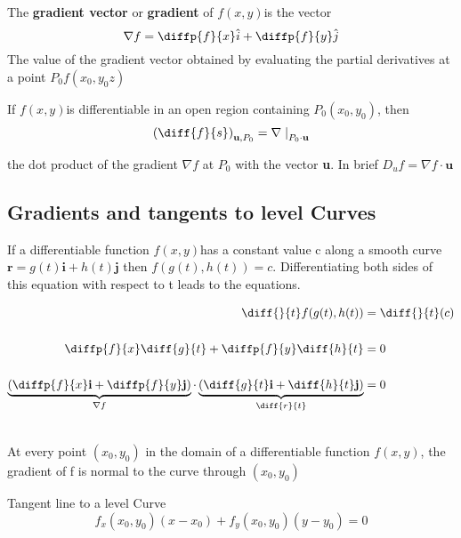 \documentclass[12pt,a4paper,draft]{article}
\newenvironment{definition}{\begin{definitionbox}}{\end{definitionbox}\vspace{1\baselineskip}}
\newenvironment{ruleBox}[1]{\begin{rulebox}{#1}}{\end{rulebox}\vspace{1\baselineskip}}
\newenvironment{mynote}{\vspace{1\baselineskip}\begin{note}}{\end{note}\vspace{1\baselineskip}}
\newcommand{\fxy}{\(f(x,y)\)}
\begin{document}
\begin{definition}
    The \textbf{gradient vector} or \textbf{gradient} of \fxy is the vector
    \[\nabla f = \diffp{f}{x} \hat{i} + \diffp{f}{y} \hat{j} \]
    The value of the gradient vector obtained by evaluating the partial derivatives at a point \(P_0 f(x_0,y_0z)\)
    
\end{definition}


\begin{definition}
    If \fxy is differentiable in an open region containing \(P_0(x_0,y_0)\), then
    \[\left(\diff{f}{s}\right)_{\mathbf{u},P_0} = \nabla \left. \right|_{P_0 \cdot \mathbf{u}}\]

    the dot product of the gradient \(\nabla f\) at \(P_0\) with the vector \textbf{u}. In brief \(D_u f = \nabla f \cdot \mathbf{u}\)

\end{definition}


\subsection{Gradients and tangents to level Curves}

If a differentiable function \fxy has a constant value c along a smooth curve \(\mathbf{r} = g(t)\mathbf{i} + h(t) \mathbf{j}\) then \(f(g(t),h(t)) = c\). Differentiating both sides of this equation with respect to t leads to the equations.


\begin{align*}
    \diff{}{t}f(g(t),h(t)) &= \diff{}{t}(c) \\[1\baselineskip]
    \diffp{f}{x} \diff{g}{t} + \diffp{f}{y} \diff{h}{t} &= 0 \\[1\baselineskip]
    \underbrace{\left(\diffp{f}{x}\mathbf{i} + \diffp{f}{y}\mathbf{j}\right)}_{\nabla f} \cdot \underbrace{\left(\diff{g}{t}\textbf{i} + \diff{h}{t}\mathbf{j}\right)}_{\diff{r}{t}} &= 0\\[1\baselineskip]
\end{align*}

\begin{mynote}
    At every point \((x_0,y_0)\) in the domain of a differentiable function \fxy, the gradient of f is normal to the curve through \((x_0,y_0)\)
\end{mynote}




\begin{ruleBox}{Tangent line to a level Curve}
    \[f_x(x_0,y_0)(x-x_0) + f_y(x_0,y_0)(y-y_0) = 0\]
\end{ruleBox}
\end{document}
